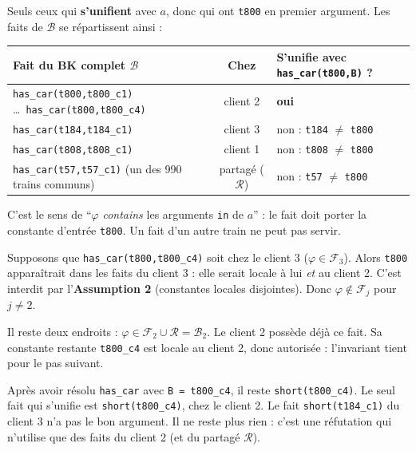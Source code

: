 \documentclass[10pt]{article}
\newcommand{\sst}[1]{\par\needspace{5\baselineskip}\vspace{3pt}{\small\bfseries\textcolor{encre}{#1}}\par\vspace{1pt}}
\begin{document}
\sst{Étape A : quels faits $\varphi$ peuvent résoudre $a$ ?}
Seuls ceux qui \textbf{s'unifient} avec $a$, donc qui ont \texttt{t800} en premier argument. Les faits de $\mathcal{B}$ se répartissent ainsi :
\renewcommand{\arraystretch}{1.25}
\begin{center}
\begin{tabular}{@{}L{6.6cm}c L{5.4cm}@{}}
\textbf{Fait du BK complet $\mathcal{B}$} & \textbf{Chez} & \textbf{S'unifie avec \texttt{has\_car(t800,B)} ?}\\\hline
\texttt{has\_car(t800,t800\_c1)} \ldots\ \texttt{has\_car(t800,t800\_c4)} & client 2 & \textcolor{vert}{\textbf{oui}}\\
\texttt{has\_car(t184,t184\_c1)} & client 3 & \textcolor{rouge}{non} : \texttt{t184} $\neq$ \texttt{t800}\\
\texttt{has\_car(t808,t808\_c1)} & client 1 & \textcolor{rouge}{non} : \texttt{t808} $\neq$ \texttt{t800}\\
\texttt{has\_car(t57,t57\_c1)} (un des 990 trains communs) & partagé ($\mathcal{R}$) & \textcolor{rouge}{non} : \texttt{t57} $\neq$ \texttt{t800}\\
\end{tabular}
\end{center}
C'est le sens de ``$\varphi$ \emph{contains} les arguments \texttt{in} de $a$'' : le fait doit porter la constante d'entrée \texttt{t800}. Un fait d'un autre train ne peut pas servir.

\sst{Étape B : pourquoi aucun fait utilisable n'est-il chez un autre client ?}
Supposons que \texttt{has\_car(t800,t800\_c4)} soit chez le client 3 ($\varphi\in\mathcal{F}_3$). Alors \texttt{t800} apparaîtrait dans les faits du client 3 : elle serait locale à lui \emph{et} au client 2. C'est interdit par l'\textbf{Assumption 2} (constantes locales disjointes). Donc $\varphi\notin\mathcal{F}_j$ pour $j\neq 2$.

\sst{Étape C : conclusion}
Il reste deux endroits : $\varphi\in\mathcal{F}_2\cup\mathcal{R}=\mathcal{B}_2$. Le client 2 possède déjà ce fait. Sa constante restante \texttt{t800\_c4} est locale au client 2, donc autorisée : l'invariant tient pour le pas suivant.

\sst{Le pas suivant : même raisonnement}
Après avoir résolu \texttt{has\_car} avec \texttt{B = t800\_c4}, il reste \texttt{short(t800\_c4)}. Le seul fait qui s'unifie est \texttt{short(t800\_c4)}, chez le client 2. Le fait \texttt{short(t184\_c1)} du client 3 n'a pas le bon argument. Il ne reste plus rien : c'est une réfutation qui n'utilise que des faits du client 2 (et du partagé $\mathcal{R}$).
\end{document}
